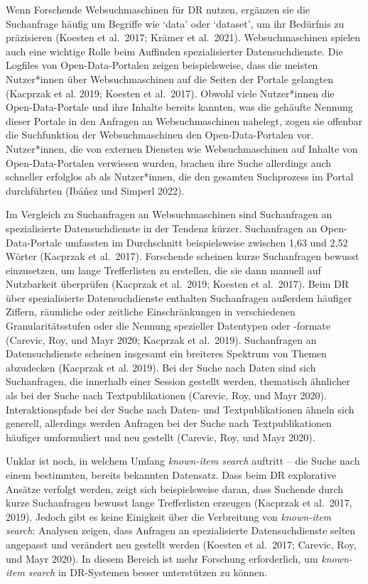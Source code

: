 \documentclass[a4paper,
fontsize=11pt,
oneside,
numbers=noperiodatend,
parskip=half-,
bibliography=totoc,
final
]{scrartcl}
\begin{document}
Wenn Forschende Websuchmaschinen für DR nutzen, ergänzen sie die
Suchanfrage häufig um Begriffe wie \enquote*{data} oder
\enquote*{dataset}, um ihr Bedürfnis zu präzisieren (Koesten et
al.~2017; Krämer et al.~2021). Websuchmaschinen spielen auch eine
wichtige Rolle beim Auffinden spezialisierter Datensuchdienste. Die
Logfiles von Open-Data-Portalen zeigen beispielsweise, dass die meisten
Nutzer*innen über Websuchmaschinen auf die Seiten der Portale gelangten
(Kacprzak et al. 2019; Koesten et al.~2017). Obwohl viele Nutzer*innen
die Open-Data-Portale und ihre Inhalte bereits kannten, was die gehäufte
Nennung dieser Portale in den Anfragen an Websuchmaschinen nahelegt,
zogen sie offenbar die Suchfunktion der Websuchmaschinen den
Open-Data-Portalen vor. Nutzer*innen, die von externen Diensten wie
Websuchmaschinen auf Inhalte von Open-Data-Portalen verwiesen wurden,
brachen ihre Suche allerdings auch schneller erfolglos ab als
Nutzer*innen, die den gesamten Suchprozess im Portal durchführten
(Ibáñez und Simperl 2022).

Im Vergleich zu Suchanfragen an Websuchmaschinen sind Suchanfragen an
spezialisierte Datensuchdienste in der Tendenz kürzer. Suchanfragen an
Open-Data-Portale umfassten im Durchschnitt beispielsweise zwischen 1,63
und 2,52 Wörter (Kacprzak et al.~2017). Forschende scheinen kurze
Suchanfragen bewusst einzusetzen, um lange Trefferlisten zu erstellen,
die sie dann manuell auf Nutzbarkeit überprüfen (Kacprzak et al.~2019;
Koesten et al.~2017). Beim DR über spezialisierte Datensuchdienste
enthalten Suchanfragen außerdem häufiger Ziffern, räumliche oder
zeitliche Einschränkungen in verschiedenen Granularitätsstufen oder die
Nennung spezieller Datentypen oder -formate (Carevic, Roy, und Mayr
2020; Kacprzak et al.~2019). Suchanfragen an Datensuchdienste scheinen
insgesamt ein breiteres Spektrum von Themen abzudecken (Kacprzak et al.
2019). Bei der Suche nach Daten sind sich Suchanfragen, die innerhalb
einer Session gestellt werden, thematisch ähnlicher als bei der Suche
nach Textpublikationen (Carevic, Roy, und Mayr 2020). Interaktionspfade
bei der Suche nach Daten- und Textpublikationen ähneln sich generell,
allerdings werden Anfragen bei der Suche nach Textpublikationen häufiger
umformuliert und neu gestellt (Carevic, Roy, und Mayr 2020).

Unklar ist noch, in welchem Umfang \emph{known-item search} auftritt --
die Suche nach einem bestimmten, bereits bekannten Datensatz. Dass beim
DR explorative Ansätze verfolgt werden, zeigt sich beispielsweise daran,
dass Suchende durch kurze Suchanfragen bewusst lange Trefferlisten
erzeugen (Kacprzak et al.~2017, 2019). Jedoch gibt es keine Einigkeit
über die Verbreitung von \emph{known-item search}: Analysen zeigen, dass
Anfragen an spezialisierte Datensuchdienste selten angepasst und
verändert neu gestellt werden (Koesten et al.~2017; Carevic, Roy, und
Mayr 2020). In diesem Bereich ist mehr Forschung erforderlich, um
\emph{known-item search} in DR-Systemen besser unterstützen zu können.
\end{document}
